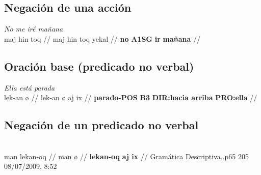 \documentclass{article}%
\begin{document}
\subsection{Negación de una acción}%
\label{subsec:Negacindeunaaccin}%

%
\par\medskip%
\ex
\textit{No me iré mañana} \\
\begingl
\gla maj hin toq //
\glb maj hin toq yekal //
\glc \textbf{no} \textbf{A1SG} \textbf{ir} \textbf{mañana} //
\endgl
\xe
%
\medskip%
\subsection{Oración base (predicado no verbal)}%
\label{subsec:Oracinbase(predicadonoverbal)}%

%
\par\medskip%
\ex
\textit{Ella está parada} \\
\begingl
\gla lek-an ø //
\glb lek-an ø aj ix //
\glc \textbf{parado-POS} \textbf{B3} \textbf{DIR:hacia arriba} \textbf{PRO:ella} //
\endgl
\xe
%
\medskip%
\subsection{Negación de un predicado no verbal}%
\label{subsec:Negacindeunpredicadonoverbal}%

%
\par\medskip%
\ex
\textit{} \\
\begingl
\gla man lekan-oq //
\glb man ø //
\glc \textbf{lekan-oq} \textbf{aj ix} //
\endgl
\xe
%
\medskip%
Gramática Descriptiva..p65 %
205 %
08/07/2009, 8:52 

%
\end{document}
